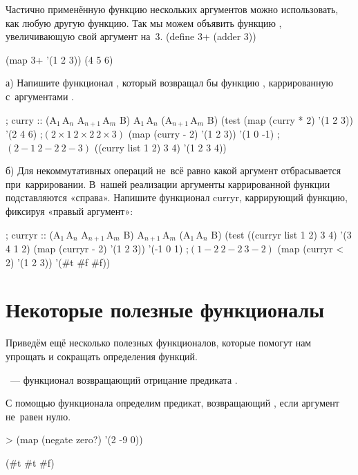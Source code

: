 \begin{example}{Частично применённую функцию нескольких аргументов можно использовать, как любую другую функцию. Так мы можем объявить функцию , увеличивающую свой аргумент на~3.}
\REPLin
  {(define 3+ (adder 3))}

\REPL
  {(map 3+ '(1 2 3))}
  {(4 5 6)}
\end{example}

\begin{Assignment}

а) Напишите функционал , который возвращал бы функцию , каррированную с~аргументами . 

\newcommand{\range}[2] {A${}_{#1}$\,\ddd\!A${}_{#2}$}

\begin{Specification}
; curry :: (\range{1}{n} \range{n+1}{m} \arrow B) \range{1}{n} \arrow (\range{n+1}{m} \arrow B)
(test
  (map (curry * 2) '(1 2 3))   '(2 4 6)  ;$(2\times1\ 2\times2\ 2\times3)$
  (map (curry - 2) '(1 2 3))  '(1 0 -1) ;$(2-1\ 2-2\ 2-3)$
  ((curry list 1 2) 3 4)     '(1 2 3 4))
\end{Specification}

б) Для некоммутативных операций не~всё равно какой аргумент отбрасывается при~каррировании. В~нашей реализации аргументы каррированной функции подставляются «справа». Напишите функционал \si{curryr}, каррирующий функцию, фиксируя «правый аргумент»: 

\begin{Specification}
; curryr :: (\range{1}{n} \range{n+1}{m} \arrow B) \range{n+1}{m} \arrow (\range{1}{n} \arrow B)
(test 
  ((curryr list 1 2) 3 4)      '(3 4 1 2)
  (map (curryr - 2) '(1 2 3))  '(-1 0 1)   ;$(1-2\ 2-2\ 3-2)$   
  (map (curryr < 2) '(1 2 3))  '(#t #f #f))  
\end{Specification}
\end{Assignment}

\section{Некоторые полезные функционалы}\label{operators}%
Приведём ещё несколько полезных функционалов, которые помогут нам упрощать и сокращать определения функций. 

~--- функционал возвращающий отрицание предиката .

\begin{example}{С помощью функционала  определим предикат, возвращающий , если аргумент не~равен нулю.}
\begin{ExampleCode}
 > (map (negate zero?) 
        '(2 -9 0))
\end{ExampleCode}
\REPLout
  {(#t #t #f)}
\end{example}

